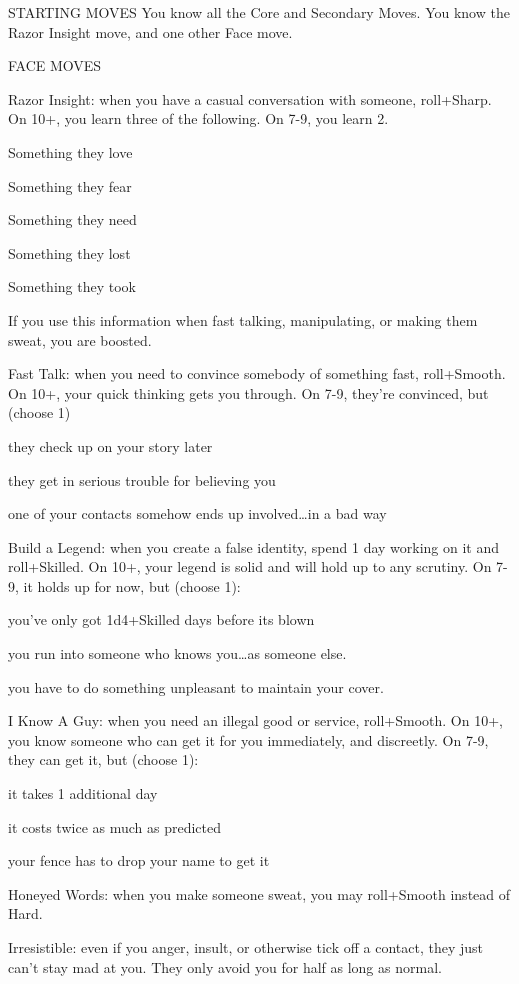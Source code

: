 STARTING MOVES
You know all the Core and Secondary Moves. You know the Razor Insight move, and one other Face move.

FACE MOVES

Razor Insight: when you have a casual conversation with someone, roll+Sharp. On 10+, you learn three of the following. On 7-9, you learn 2.

Something they love

Something they fear

Something they need

Something they lost

Something they took

If you use this information when fast talking, manipulating, or making them sweat, you are boosted.

Fast Talk: when you need to convince somebody of something fast, roll+Smooth. On 10+, your quick thinking gets you through. On 7-9, they’re convinced, but (choose 1)

they check up on your story later

they get in serious trouble for believing you

one of your contacts somehow ends up involved…in a bad way

Build a Legend: when you create a false identity, spend 1 day working on it and roll+Skilled. On 10+, your legend is solid and will hold up to any scrutiny. On 7-9, it holds up for now, but (choose 1):

you’ve only got 1d4+Skilled days before its blown

you run into someone who knows you…as someone else.

you have to do something unpleasant to maintain your cover.

I Know A Guy: when you need an illegal good or service, roll+Smooth. On 10+, you know someone who can get it for you immediately, and discreetly. On 7-9, they can get it, but (choose 1):

it takes 1 additional day

it costs twice as much as predicted

your fence has to drop your name to get it

Honeyed Words: when you make someone sweat, you may roll+Smooth instead of Hard.

Irresistible: even if you anger, insult, or otherwise tick off a contact, they just can’t stay mad at you. They only avoid you for half as long as normal.



